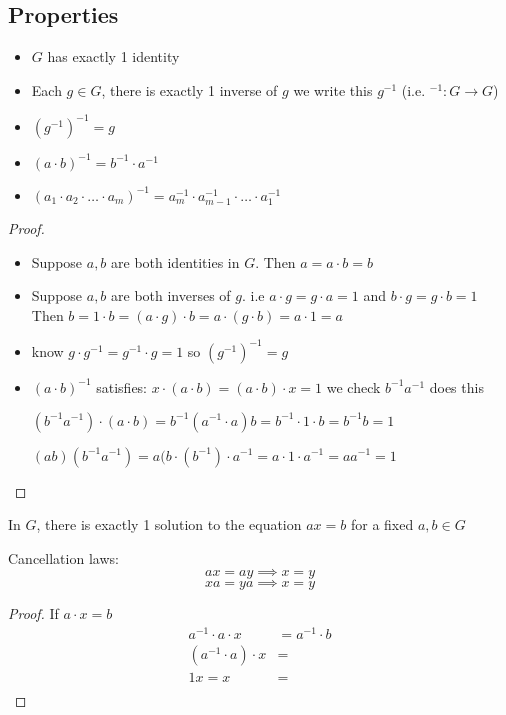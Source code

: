 \subsection{Properties}
\begin{itemize}
  \item $G$ has exactly 1 identity
  \item Each $g \in G$, there is exactly 1 inverse of $g$ we write this $g^{-1}$
  (i.e. $^{-1}: G \rightarrow G$)
  \item $(g^{-1})^{-1} = g$
  \item $(a \cdot b)^{-1} = b^{-1} \cdot a^{-1}$
  \item $(a_1 \cdot a_2 \cdot \dotsc \cdot a_m)^{-1} = a_m^{-1} \cdot a_{m-1}^{-1} \cdot \dotsc \cdot a_1^{-1}$
\end{itemize}

\begin{proof}
  \text{}
  \begin{itemize}
    \item Suppose $a, b$ are both identities in $G$. Then $a = a \cdot b = b$
    \item Suppose $a, b$ are both inverses of $g$. i.e $a\cdot g = g\cdot a = 1$ and 
    $b\cdot g = g\cdot b = 1$ Then $b = 1\cdot b = (a\cdot g)\cdot b = a\cdot(g\cdot b) = a\cdot 1 = a$ 
    \item know $g\cdot g^{-1} = g^{-1}\cdot g = 1$ so $(g^{-1})^{-1} = g$
    \item $(a \cdot b)^{-1}$ satisfies: $x\cdot(a\cdot b) = (a\cdot b)\cdot x = 1$ 
    we check $b^{-1}a^{-1}$ does this 

    $(b^{-1}a^{-1})\cdot(a\cdot b) = b^{-1}(a^{-1}\cdot a)b = b^{-1} \cdot 1 \cdot b = b^{-1}b = 1$

    $(ab)(b^{-1}a^{-1}) = a(b\cdot(b^{-1})\cdot a^{-1} = a \cdot 1 \cdot a^{-1} = aa^{-1} = 1$
  \end{itemize}
\end{proof}

\begin{theorem}
  In $G$, there is exactly 1 solution to the equation $ax = b$ for a fixed $a, b \in G$
\end{theorem}

\begin{corollary*}
  Cancellation laws:
  \[ax = ay \implies x = y\]
  \[xa = ya \implies x = y\]
\end{corollary*}

\begin{proof}
  If $a\cdot x = b$
  \begin{align*}
    a^{-1}\cdot a\cdot x &= a^{-1}\cdot b \\
    (a^{-1}\cdot a)\cdot x &=  \\
    1x = x &= \\
  \end{align*}
\end{proof}


